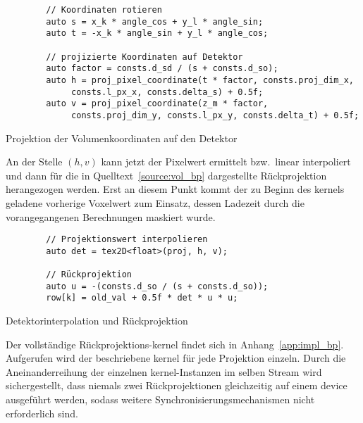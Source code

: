 \begin{code}
\begin{verbatim}
        // Koordinaten rotieren
        auto s = x_k * angle_cos + y_l * angle_sin;
        auto t = -x_k * angle_sin + y_l * angle_cos;

        // projizierte Koordinaten auf Detektor
        auto factor = consts.d_sd / (s + consts.d_so);
        auto h = proj_pixel_coordinate(t * factor, consts.proj_dim_x,
             consts.l_px_x, consts.delta_s) + 0.5f;
        auto v = proj_pixel_coordinate(z_m * factor,
             consts.proj_dim_y, consts.l_px_y, consts.delta_t) + 0.5f;
\end{verbatim}
\caption{Projektion der Volumenkoordinaten auf den Detektor}
\label{source:vol_coord_rot}
\end{code}

An der Stelle $(h, v)$ kann jetzt der Pixelwert ermittelt bzw.\ linear interpoliert und dann für die in
Quelltext~\ref{source:vol_bp} dargestellte Rückprojektion herangezogen werden. Erst an diesem Punkt kommt der zu Beginn
des \gls{kernel}s geladene vorherige Voxelwert zum Einsatz, dessen Ladezeit durch die vorangegangenen Berechnungen
maskiert wurde.

\begin{code}
\begin{verbatim}
        // Projektionswert interpolieren
        auto det = tex2D<float>(proj, h, v);

        // Rückprojektion
        auto u = -(consts.d_so / (s + consts.d_so));
        row[k] = old_val + 0.5f * det * u * u;
\end{verbatim}
\caption{Detektorinterpolation und Rückprojektion}
\label{source:vol_bp}
\end{code}

Der vollständige Rückprojektions-\gls{kernel} findet sich in Anhang~\ref{app:impl_bp}. Aufgerufen wird der beschriebene
\gls{kernel} für jede Projektion einzeln. Durch die Aneinanderreihung der einzelnen \gls{kernel}-Instanzen im selben
Stream wird sichergestellt, dass niemals zwei Rückprojektionen gleichzeitig auf einem \gls{device} ausgeführt werden,
sodass weitere Synchronisierungsmechanismen nicht erforderlich sind.
